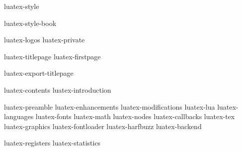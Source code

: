 

\environment luatex-style

\startmode[book]
    \environment luatex-style-book
\stopmode

\environment luatex-logos
\environment luatex-private

\startmode[export]

    \setupbackend
      [export=luatex]

\stopmode

\startdocument
  [manual=Lua\TeX,
   status=stable,
   version=1.27]

\startnotmode[*export]
    \component luatex-titlepage
    \component luatex-firstpage
\stopnotmode

\startmode[*export]
    \component luatex-export-titlepage
\stopmode

\startfrontmatter
    \component luatex-contents
    \component luatex-introduction
\stopfrontmatter

\startbodymatter
    \component luatex-preamble
    \component luatex-enhancements
    \component luatex-modifications
    \component luatex-lua
    \component luatex-languages
    \component luatex-fonts
    \component luatex-math
    \component luatex-nodes
    \component luatex-callbacks
    \component luatex-tex
    \component luatex-graphics
    \component luatex-fontloader
    \component luatex-harfbuzz
    \component luatex-backend
\stopbodymatter

\startbackmatter
    \component luatex-registers
    \component luatex-statistics
\stopbackmatter

\stopdocument
